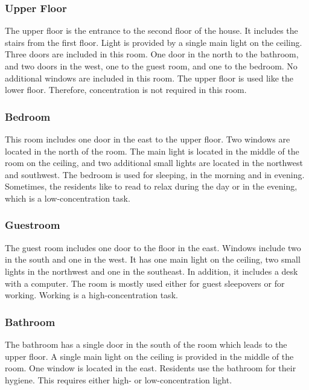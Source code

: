 \documentclass[letterpaper, 11pt]{Proposal}
\begin{document}
\subsubsection{Upper Floor}\label{subsec:04_rooms_upFloor}
The upper floor is the entrance to the second floor of the house.
It includes the stairs from the first floor.
Light is provided by a single main light on the ceiling.
Three doors are included in this room. 
One door in the north to the bathroom, and two doors
in the west, one to the guest room, and one to the bedroom.
No additional windows are included in this room.
The upper floor is used like the lower floor. 
Therefore, concentration is not required in this room.

\subsubsection{Bedroom}\label{subsec:04_rooms_bedroom}
This room includes one door in the east to the upper floor.
Two windows are located in the north of the room.
The main light is located in the middle of the room on the ceiling,
and two additional small lights are located in the northwest and southwest.
The bedroom is used for sleeping, in the morning and in evening.
Sometimes, the residents like to read to relax during the day or in the evening,
which is a low-concentration task.

\subsubsection{Guestroom}\label{subsec:04_rooms_guestroom}
The guest room includes one door to the floor in the east.
Windows include two in the south and one in the west.
It has one main light on the ceiling, two small lights in the northwest 
and one in the southeast.
In addition, it includes a desk with a computer.
The room is mostly used either for guest sleepovers or for working.
Working is a high-concentration task.

\subsubsection{Bathroom}\label{subsec:04_rooms_bathroom}
The bathroom has a single door in the south of the room
which leads to the upper floor.
A single main light on the ceiling is provided in the middle
of the room.
One window is located in the east.
Residents use the bathroom for their hygiene. This requires either
high- or low-concentration light.
\end{document}
